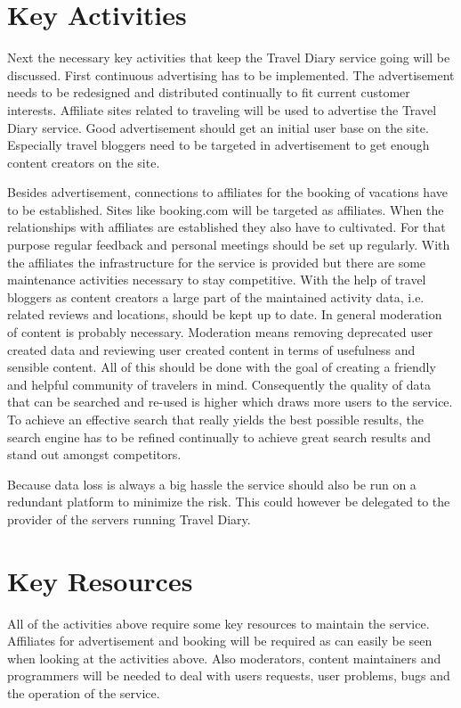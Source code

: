 \documentclass[IN,english]{tumbook}
\begin{document}
\section{Key Activities}

Next the necessary key activities that keep the Travel Diary service going will be discussed. First continuous advertising has to be implemented. The advertisement needs to be redesigned and distributed continually to fit current customer interests. Affiliate sites related to traveling will be used to advertise the Travel Diary service. Good advertisement should get an initial user base on the site. Especially travel bloggers need to be targeted in advertisement to get enough content creators on the site.

Besides advertisement, connections to affiliates for the booking of vacations have to be established. Sites like booking.com will be targeted as affiliates. When the relationships with affiliates are established they also have to cultivated. For that purpose regular feedback and personal meetings should be set up regularly. With the affiliates the infrastructure for the service is provided but there are some maintenance activities necessary to stay competitive.
With the help of travel bloggers as content creators a large part of the maintained activity data, i.e. related reviews and locations, should be kept up to date. In general moderation of content is probably necessary. Moderation means removing deprecated user created data and reviewing user created content in terms of usefulness and sensible content. All of this should be done with the goal of creating a friendly and helpful community of travelers in mind. Consequently the quality of data that can be searched and re-used is higher which draws more users to the service. To achieve an effective search that really yields the best possible results, the search engine has to be refined continually to achieve great search results and stand out amongst competitors.

Because data loss is always a big hassle the service should also be run on a redundant platform to minimize the risk. This could however be delegated to the provider of the servers running Travel Diary.

\section{Key Resources}

All of the activities above require some key resources to maintain the service. Affiliates for advertisement and booking will be required as can easily be seen when looking at the activities above. Also moderators, content maintainers and programmers will be needed to deal with users requests, user problems, bugs and the operation of the service.
\end{document}
